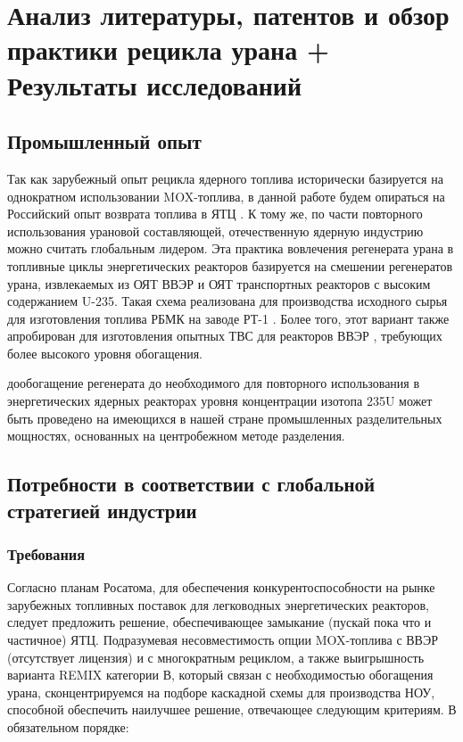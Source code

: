 \chapter{Анализ литературы, патентов и обзор практики рецикла урана + Результаты исследований}\label{ch:ch1}

\section{Промышленный опыт}\label{sec:ch1/sec1}
Так как зарубежный опыт рецикла ядерного топлива исторически базируется на однократном использовании MOX-топлива, в данной работе будем опираться на Российский опыт возврата топлива в ЯТЦ \cite{international2003iaea}. К тому же, по части повторного использования урановой составляющей, отечественную ядерную индустрию можно считать глобальным лидером.  Эта практика вовлечения регенерата урана в топливные циклы энергетических реакторов базируется на смешении регенератов урана, извлекаемых из ОЯТ ВВЭР и ОЯТ транспортных реакторов с высоким содержанием U-235. Такая схема реализована для производства исходного сырья для изготовления топлива РБМК на заводе РТ-1 \cite{volkVozvratUranaIz2010}. Более того, этот вариант также апробирован для изготовления опытных ТВС для реакторов ВВЭР \cite{proselkovAnalizVozmozhnostiIspolzovaniya2003}, требующих более высокого уровня обогащения. 

дообогащение регенерата до необходимого для повторного использования в энергетических ядерных реакторах уровня концентрации изотопа 235U может быть проведено на имеющихся в нашей стране промышленных разделительных мощностях, основанных на центробежном методе разделения. 

\section{Потребности в соответствии с глобальной стратегией индустрии}\label{sec:ch1/sec2}


\subsection{Требования}\label{sec:ch1/sec1.1}
Согласно планам Росатома, для обеспечения конкурентоспособности на рынке зарубежных топливных поставок для легководных энергетических реакторов, следует предложить решение, обеспечивающее замыкание (пускай пока что и частичное) ЯТЦ. Подразумевая несовместимость опции MOX-топлива с ВВЭР (отсутствует лицензия) и с многократным рециклом, а также выигрышность варианта REMIX категории В, который связан с необходимостью обогащения урана, сконцентрируемся на подборе каскадной схемы для производства НОУ, способной обеспечить наилучшее решение, отвечающее следующим критериям. В обязательном порядке:

